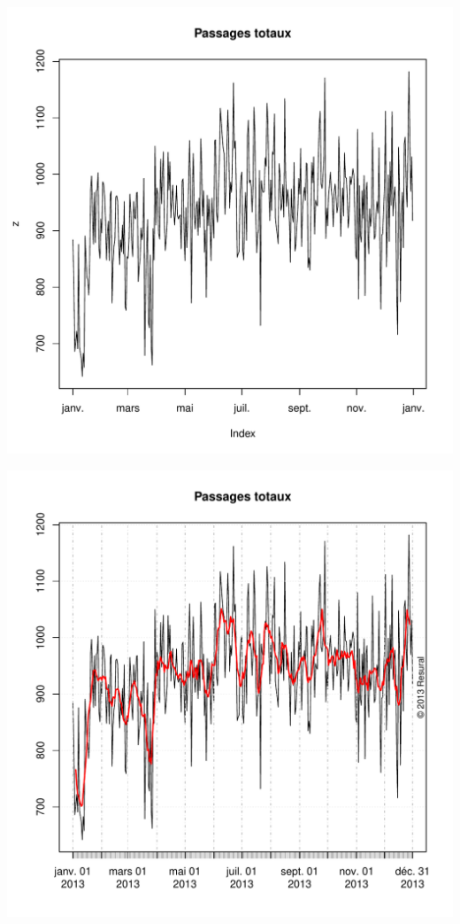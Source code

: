 \documentclass[12pt,english,french,twoside]{book}\usepackage[]{graphicx}\usepackage[]{color}
\makeatletter
\def\maxwidth{ %
  \ifdim\Gin@nat@width>\linewidth
    \linewidth
  \else
    \Gin@nat@width
  \fi
}
\makeatother
\begin{document}
\includegraphics[width=\maxwidth]{figure/passages_totaux2} 

\includegraphics[width=\maxwidth]{figure/passages_totaux3} 
\end{document}
